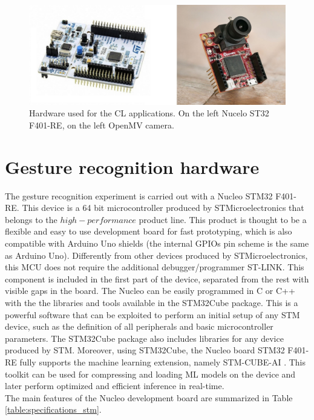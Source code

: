 \documentclass[12pt]{report}
\begin{document}
\begin{figure}[h!]
    \centering
    \includegraphics[width=120mm]{Figures/Chapter2/hardware.jpg} 
    \caption{Hardware used for the CL applications. On the left Nucelo ST32 F401-RE, on the left OpenMV camera.}
    \label{fig:hardware_all}    
\end{figure}

\section{Gesture recognition hardware}
The gesture recognition experiment is carried out with a Nucleo STM32 F401-RE. This device is a 64 bit microcontroller produced by STMicroelectronics that belongs to the $high-performance$ product line. This product is thought to be a flexible and easy to use development board for fast prototyping, which is also compatible with Arduino Uno shields (the internal GPIOs pin scheme is the same as Arduino Uno). Differently from other devices produced by STMicroelectronics, this MCU does not require the additional debugger/programmer ST-LINK. This component is included in the first part of the device, separated from the rest with visible gaps in the board. The Nucleo can be easily programmed in C or C++ with the the libraries and tools available in the STM32Cube package. This is a powerful software that can be exploited to perform an initial setup of any STM device, such as the definition of all peripherals and basic microcontroller parameters. The STM32Cube package also includes libraries for any device produced by STM. Moreover, using STM32Cube, the Nucleo board STM32 F401-RE fully supports the machine learning extension, namely STM-CUBE-AI \cite{stm_cube_ai}. This toolkit can be used for compressing and loading ML models on the device and later perform optimized and efficient inference in real-time. \\
The main features of the Nucleo development board are summarized in Table \ref{table:specifications_stm}.\\
\end{document}
